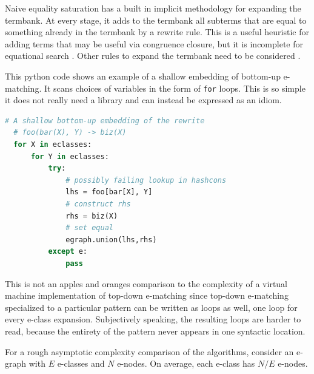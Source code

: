 \documentclass[sigconf]{acmart}
\begin{document}
Naive equality saturation has a built in implicit methodology for expanding the termbank. At every stage, it adds to the termbank all subterms that are equal to something already in the termbank by a rewrite rule. This is a useful heuristic for adding terms that may be useful via congruence closure, but it is incomplete for equational search  \cite{remybirkhoff}. Other rules to expand the termbank need to be considered \cite{GeMoura2009}.



This python code shows an example of a shallow embedding of bottom-up e-matching. It scans choices of variables in the form of \lstinline{for} loops. This is so simple it does not really need a library and can instead be expressed as an idiom.

\begin{lstlisting}[language=Python]
  # A shallow bottom-up embedding of the rewrite
  # foo(bar(X), Y) -> biz(X)
  for X in eclasses:
      for Y in eclasses:
          try:
              # possibly failing lookup in hashcons
              lhs = foo[bar[X], Y]  
              # construct rhs
              rhs = biz(X)          
              # set equal
              egraph.union(lhs,rhs) 
          except e:
              pass
  \end{lstlisting}

This is not an apples and oranges comparison to the complexity of a virtual machine implementation of top-down e-matching \cite{z3ematching} since top-down e-matching specialized to a particular pattern can be written as loops as well, one loop for every e-class expansion. Subjectively speaking, the resulting loops are harder to read, because the entirety of the pattern never appears in one syntactic location.



For a rough asymptotic complexity comparison of the algorithms, consider an e-graph with $E$ e-classes and $N$ e-nodes. On average, each e-class has $N/E$ e-nodes.
\end{document}
